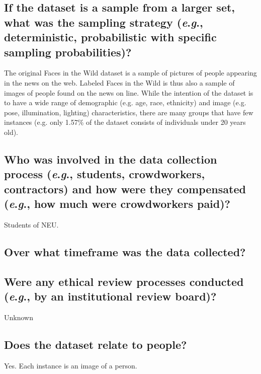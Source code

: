 \documentclass[a4paper,9pt]{extarticle}
\newcommand{\eg}{\textit{e}.\textit{g}., }
\begin{document}
\begin{multicols}{2}
\subsection*{If the dataset is a sample from a larger set, what was the sampling strategy (\eg deterministic, probabilistic with specific sampling probabilities)?}

\noindent The original Faces in the Wild dataset is a sample of pictures of people appearing in the news on the web. Labeled Faces in the
Wild is thus also a sample of images of people found on the news
on line. While the intention of the dataset is to have a wide range
of demographic (e.g. age, race, ethnicity) and image (e.g. pose,
illumination, lighting) characteristics, there are many groups that
have few instances (e.g. only 1.57\% of the dataset consists of
individuals under 20 years old).

\subsection*{Who was involved in the data collection process (\eg students, crowdworkers, contractors) and how were they compensated (\eg
how much were crowdworkers paid)?}

\noindent Students of NEU.

\subsection*{Over what timeframe was the data collected?}




\subsection*{Were any ethical review processes conducted (\eg by an institutional review board)?}
\noindent Unknown


\subsection*{Does the dataset relate to people?}
\noindent Yes. Each instance is an image of a person.


\end{multicols}
\end{document}
